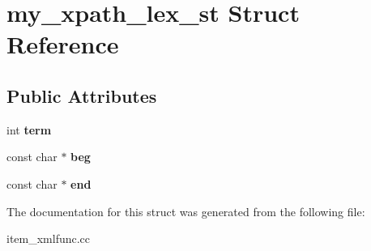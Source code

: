 \hypertarget{structmy__xpath__lex__st}{}\section{my\+\_\+xpath\+\_\+lex\+\_\+st Struct Reference}
\label{structmy__xpath__lex__st}
\subsection*{Public Attributes}
\begin{DoxyCompactItemize}
\item 
\mbox{\label{structmy__xpath__lex__st_acb71f2f03c1e3503bdb3f8172a642b81}} 
int {\bfseries term}
\item 
\mbox{\label{structmy__xpath__lex__st_a9a1a0f2559e62c130b7320c8b297f71b}} 
const char $\ast$ {\bfseries beg}
\item 
\mbox{\label{structmy__xpath__lex__st_af1892bff722aed8f46938732b7d5e27f}} 
const char $\ast$ {\bfseries end}
\end{DoxyCompactItemize}


The documentation for this struct was generated from the following file\+:\begin{DoxyCompactItemize}
\item 
item\+\_\+xmlfunc.\+cc\end{DoxyCompactItemize}

